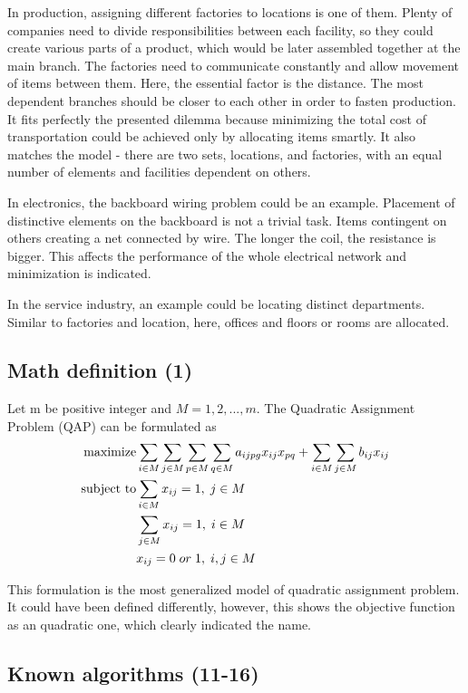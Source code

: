 In production, assigning different factories to locations is one of them.
Plenty of companies need to divide responsibilities between each facility, so they could create various parts of a product, which would be later assembled together at the main branch.
The factories need to communicate constantly and allow movement of items between them.
Here, the essential factor is the distance.
The most dependent branches should be closer to each other in order to fasten production.
It fits perfectly the presented dilemma because minimizing the total cost of transportation could be achieved only by allocating items smartly.
It also matches the model - there are two sets, locations, and factories, with an equal number of elements and facilities dependent on others.

In electronics, the backboard wiring problem could be an example.
Placement of distinctive elements on the backboard is not a trivial task.
Items contingent on others creating a net connected by wire.
The longer the coil, the resistance is bigger.
This affects the performance of the whole electrical network and minimization is indicated.

In the service industry, an example could be locating distinct departments.
Similar to factories and location, here, offices and floors or rooms are allocated.

\subsection{Math definition (1)}

Let m be positive integer and $M = { 1, 2, ..., m }$. The Quadratic Assignment Problem (QAP) can be formulated as
\begin{align}
  \text{maximize} &\null \sum_{i \in M} \sum_{j \in M} \sum_{p \in M} \sum_{q \in M} a_{ijpg}x_{ij}x_{pq} + \sum_{i \in M} \sum_{j \in M} b_{ij} x_{ij} \\
  \text{subject to} &\null \sum_{i \in M} x_{ij} = 1, \; j \in M \\
  &\null \sum_{j \in M} x_{ij} = 1, \; i \in M \\
  &\null x_{ij} = 0 \; or \; 1, \; i, j \in M
\end{align}

This formulation is the most generalized model of quadratic assignment problem.
It could have been defined differently, however, this shows the objective function as an quadratic one, which clearly indicated the name.

\subsection{Known algorithms (11-16)}

